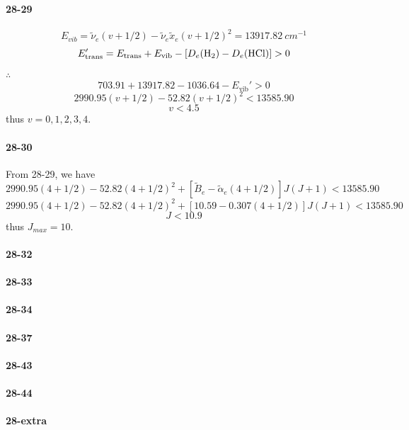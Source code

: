 \documentclass[a4paper]{article}
\newcommand{\ex}[1]{\paragraph{28-#1}}
\numberwithin{equation}{section}
\begin{document}
\ex{29}
\begin{equation}\label{key}
E_{vib} = \tilde{\nu}_e(v+1/2) - \tilde{\nu}_e\tilde{x}_e(v+1/2)^2 = \SI{13917.82}{cm^{-1}}
\end{equation}
\begin{equation}\label{key}
E_{\text{trans}}' = E_{\text{trans}} + E_{\text{vib}} - [D_e(\ce{H_2})-D_e(\ce{HCl})] > 0
\end{equation}
$ \therefore $
\begin{equation}\label{key}
703.91 + 13917.82 - 1036.64   - E_{\text{vib}}' > 0 
\end{equation}
\begin{equation}\label{key}
2990.95(v+1/2) - 52.82(v+1/2)^2 < 13585.90
\end{equation}
\begin{equation}\label{key}
v < 4.5
\end{equation}
thus $ v = 0,1,2,3,4 $.

\ex{30}
From 28-29, we have
\begin{equation}\label{key}
2990.95(4+1/2) - 52.82(4+1/2)^2 + [\tilde{B}_e - \tilde\alpha_e(4+1/2)]J(J+1) < 13585.90
\end{equation}
\begin{equation}\label{key}
2990.95(4+1/2) - 52.82(4+1/2)^2 + [10.59 - 0.307(4+1/2)]J(J+1) < 13585.90
\end{equation}
\begin{equation}\label{key}
J < 10.9
\end{equation}
thus $ J_{max} = 10 $.

\ex{32}



\ex{33}



\ex{34}


\ex{37}


\ex{43}



\ex{44}


\ex{extra}
\end{document}
